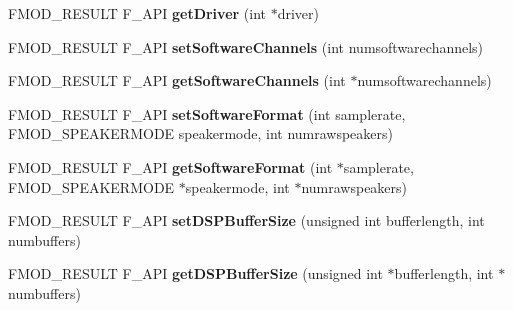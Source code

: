 \begin{DoxyCompactItemize}
\item 
\hypertarget{class_f_m_o_d_1_1_system_aeba7030e04c4604da112264e3ddbb8e6}{F\+M\+O\+D\+\_\+\+R\+E\+S\+U\+L\+T F\+\_\+\+A\+P\+I {\bfseries get\+Driver} (int $\ast$driver)}\label{class_f_m_o_d_1_1_system_aeba7030e04c4604da112264e3ddbb8e6}

\item 
\hypertarget{class_f_m_o_d_1_1_system_ad12789aa16134fb66520aca1cb1419c6}{F\+M\+O\+D\+\_\+\+R\+E\+S\+U\+L\+T F\+\_\+\+A\+P\+I {\bfseries set\+Software\+Channels} (int numsoftwarechannels)}\label{class_f_m_o_d_1_1_system_ad12789aa16134fb66520aca1cb1419c6}

\item 
\hypertarget{class_f_m_o_d_1_1_system_a210d30f8df72c80d31bc38f5a8e116d0}{F\+M\+O\+D\+\_\+\+R\+E\+S\+U\+L\+T F\+\_\+\+A\+P\+I {\bfseries get\+Software\+Channels} (int $\ast$numsoftwarechannels)}\label{class_f_m_o_d_1_1_system_a210d30f8df72c80d31bc38f5a8e116d0}

\item 
\hypertarget{class_f_m_o_d_1_1_system_af45d03004a533319b4c56e2f13158531}{F\+M\+O\+D\+\_\+\+R\+E\+S\+U\+L\+T F\+\_\+\+A\+P\+I {\bfseries set\+Software\+Format} (int samplerate, F\+M\+O\+D\+\_\+\+S\+P\+E\+A\+K\+E\+R\+M\+O\+D\+E speakermode, int numrawspeakers)}\label{class_f_m_o_d_1_1_system_af45d03004a533319b4c56e2f13158531}

\item 
\hypertarget{class_f_m_o_d_1_1_system_a429d3d9c082329c16a5a827a9beab19f}{F\+M\+O\+D\+\_\+\+R\+E\+S\+U\+L\+T F\+\_\+\+A\+P\+I {\bfseries get\+Software\+Format} (int $\ast$samplerate, F\+M\+O\+D\+\_\+\+S\+P\+E\+A\+K\+E\+R\+M\+O\+D\+E $\ast$speakermode, int $\ast$numrawspeakers)}\label{class_f_m_o_d_1_1_system_a429d3d9c082329c16a5a827a9beab19f}

\item 
\hypertarget{class_f_m_o_d_1_1_system_af715ce88b8dd4b9653a09ba8ea7e7cfd}{F\+M\+O\+D\+\_\+\+R\+E\+S\+U\+L\+T F\+\_\+\+A\+P\+I {\bfseries set\+D\+S\+P\+Buffer\+Size} (unsigned int bufferlength, int numbuffers)}\label{class_f_m_o_d_1_1_system_af715ce88b8dd4b9653a09ba8ea7e7cfd}

\item 
\hypertarget{class_f_m_o_d_1_1_system_a2aa3e1c3193075a3dac5fd35361f8df5}{F\+M\+O\+D\+\_\+\+R\+E\+S\+U\+L\+T F\+\_\+\+A\+P\+I {\bfseries get\+D\+S\+P\+Buffer\+Size} (unsigned int $\ast$bufferlength, int $\ast$numbuffers)}\label{class_f_m_o_d_1_1_system_a2aa3e1c3193075a3dac5fd35361f8df5}


\end{DoxyCompactItemize}
